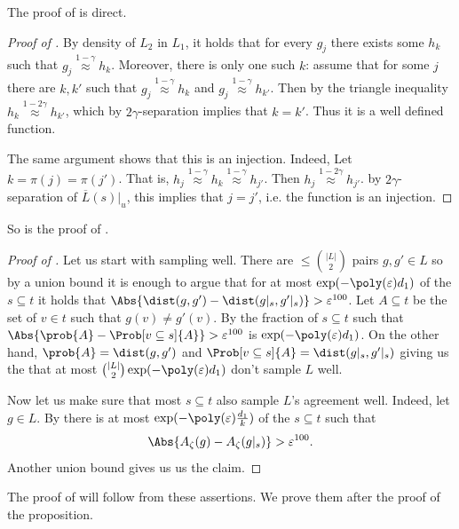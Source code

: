 The proof of  is direct.
\begin{proof}[Proof of ]
     By density of \(L_2\) in \(L_1\), it holds that for every \(g_j\) there exists some \(h_k\) such that \(g_j \overset{1-\gamma}{\approx} h_k\). Moreover, there is only one such \(k\): assume that for some \(j\) there are \(k,k'\) such that \(g_j \overset{1-\gamma}{\approx} h_k\) and \(g_j \overset{1-\gamma}{\approx} h_{k'}\). Then by the triangle inequality \(h_k \overset{1-2\gamma}{\approx} h_{k'}\), which by \(2\gamma\)-separation implies that \(k=k'\). Thus it is a well defined function.

The same argument shows that this is an injection. Indeed, Let \(k=\pi(j)=\pi(j')\). That is, \(h_j \overset{1-\gamma}{\approx} h_k \overset{1-\gamma}{\approx} h_{j'}\). Then \(h_j \overset{1-2\gamma}{\approx} h_{j'}\). by \(2\gamma\)-separation of \(\overline{L}(s)|_u\), this implies that \(j=j'\), i.e. the function is an injection.
\end{proof}

So is the proof of .
\begin{proof}[Proof of ]
    Let us start with sampling well. There are \(\leq \binom{|L|}{2}\) pairs \(g,g' \in L\) so by a union bound it is enough to argue that for at most \(\exp(-\poly(\varepsilon)d_1)\) of the \(s \subseteq t\) it holds that \(\Abs{\dist(g,g')-\dist(g|_s,g'|_s)} > \varepsilon^{100}\). Let \(A \subseteq t\) be the set of \(v \in t\) such that \(g(v)\ne g'(v)\). By  the fraction of \(s \subseteq t\) such that \(\Abs{\prob{A} - \Prob[v \subseteq s]{A}} > \varepsilon^{100}\) is \(\exp(-\poly(\varepsilon)d_1)\). On the other hand, \(\prob{A} = \dist(g,g')\) and \(\Prob[v \subseteq s]{A} = \dist(g|_s,g'|_s)\) giving us the that at most \(\binom{|L|}{2}\exp(-\poly(\varepsilon)d_1)\) don't sample \(L\) well.

    Now let us make sure that most \(s \subseteq t\) also sample \(L\)'s agreement well. Indeed, let \(g \in L\). By  there is at most \(\exp(-\poly(\varepsilon)\frac{d_1}{k})\) of the \(s \subseteq t\) such that 
    \[\Abs{A_{\zeta}(g) - A_{\zeta}(g|_s)} > \varepsilon^{100}.\]
    Another union bound gives us us the claim.
\end{proof}

The proof of  will follow from these assertions. We prove them after the proof of the proposition.
\begin{claim} 
\end{claim}

